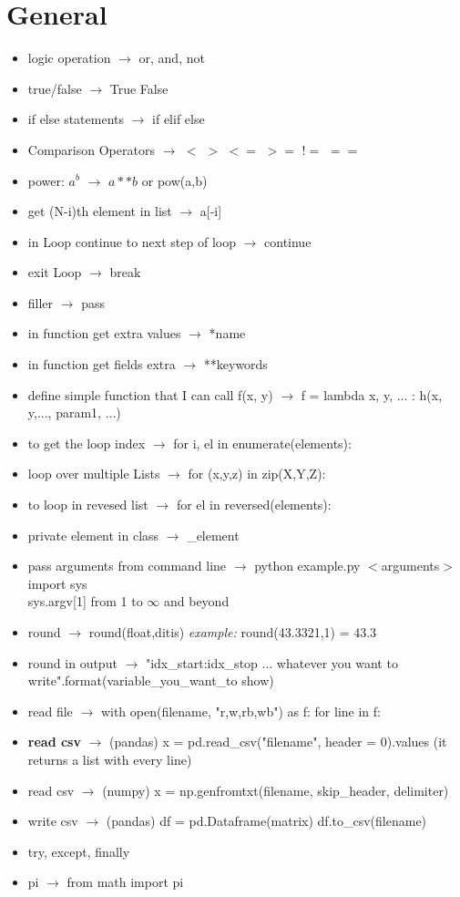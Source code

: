 \documentclass{article}
\begin{document}
\section{General}
\begin{itemize}
\item logic operation $\rightarrow$ or, and, not
\item true/false $\rightarrow$ True False
\item if else statements $\rightarrow$ if elif else
\item Comparison Operators $\rightarrow$  $<$ \quad  $>$ \quad  $<=$ \quad  $>=$ \quad    $!=$  \quad $==$
\item power: $a^{b}$ $\rightarrow$ $a**b$ or pow(a,b)
\item get (N-i)th element in list $\rightarrow$ a[-i]
\item in Loop continue to next step of loop $\rightarrow$ continue
\item exit Loop $\rightarrow$ break
\item filler $\rightarrow$ pass
\item in function get extra values $\rightarrow$ *name
\item in function get fields extra $\rightarrow$ **keywords
\item define simple function that I can call f(x, y) $\rightarrow$ f = lambda x, y, ... : h(x, y,..., param1, ...)
\item to get the loop index $\rightarrow$ for i, el in enumerate(elements):
\item loop over multiple Lists $\rightarrow$ for (x,y,z) in zip(X,Y,Z):
\item to loop in revesed list $\rightarrow$ for  el in reversed(elements):
\item private element in class $\rightarrow$ \_element
\item pass arguments from command line $\rightarrow$ python example.py $<$arguments$>$      \\
                                                import sys \\
                                                sys.argv[1]  from 1 to $\infty$ and beyond
\item round $\rightarrow$ round(float,ditis) \textit{example:} round(43.3321,1) = 43.3
\item round in output $\rightarrow$ "{idx\_start:idx\_stop} ... whatever you want to write".format(variable\_you\_want\_to show)
\item read file $\rightarrow$ with open(filename, "r,w,rb,wb") as f:
                                for line in f:
\item \textbf{read csv} $\rightarrow$ (pandas) x = pd.read\_csv("filename", header = 0).values (it returns a list with every line)
\item read csv $\rightarrow$ (numpy) x = np.genfromtxt(filename, skip\_header, delimiter)
\item write csv $\rightarrow$ (pandas) df = pd.Dataframe(matrix)
                                    df.to\_csv(filename)
\item try, except, finally
\item pi $\rightarrow$ from math import pi
\end{itemize}
\end{document}
